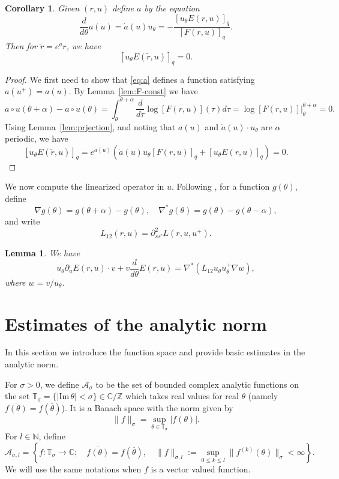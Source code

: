 \documentclass[12pt,reqno]{amsart}
\newtheorem{lem}[thm]{Lemma}
\newtheorem{cor}[thm]{Corollary}
\theoremstyle{remark}
\begin{document}
\begin{cor}\label{cor:proj}
Given $(r, u)$ define $a$ by the equation 
\begin{equation}
	\label{eq:a}
	\frac{d}{d\theta} a(u) = \dot{a}(u) u_\theta = - \frac{[u_\theta E(r, u)]_q}{[F(r, u)]_q}. 
\end{equation}
Then for ${\tilde{r}} = e^a r$, we have 
\[
	[u_\theta E({\tilde{r}}, u)]_q = 0. 
\]
\end{cor}
\begin{proof}
	We first need to show that \eqref{eq:a} defines a function satisfying $a(u^+) = a(u)$. By Lemma~\ref{lem:F-const} we have 
	\[
		a\circ u(\theta + \alpha) - a \circ u(\theta) = \int_{\theta}^{\theta + \alpha} \frac{d}{d \tau} \log [F(r, u)](\tau) d\tau = \log[F(r, u)]\bigr|_\theta^{\theta + \alpha} = 0. 
	\]
	Using Lemma~\ref{lem:prjection}, and noting that $a(u)$ and $\dot{a}(u) \cdot u_\theta$ are $\alpha$ periodic, we have 
	\[
		[u_\theta E({\tilde{r}}, u)]_q = e^{a(u)} \left( \dot{a}(u) u_\theta [F(r, u)]_q + [u_\theta E(r, u)]_q \right) = 0. 
	\]
\end{proof}

We now compute the linearized operator in $u$. Following \cite{LM2001}, for a function $g(\theta)$, define 
\[
	\nabla g(\theta) = g(\theta + \alpha) - g(\theta), \quad 
	\nabla^* g(\theta) = g(\theta) - g(\theta - \alpha), 
\]
and write 
\[
	L_{12}(r, u) = \partial^2_{ss'}L(r, u, u^+). 
\]

\begin{lem}\cite{LM2001}
We have 
\begin{equation}
	\label{eq:moser-levi}
	u_\theta \partial_u E(r, u)\cdot v + v \frac{d}{d\theta} E(r, u) = 
	\nabla^*\left( L_{12} u_\theta u_\theta^+ \nabla w \right),
\end{equation}
where $w = v/u_\theta$. 
\end{lem}

\section{Estimates of the analytic norm}
\label{sec:analytic-est}

In this section we introduce the function space and provide basic estimates in the analytic norm. 

For $\sigma >0$, we define ${\mathcal{A}}_\sigma$ to be the set of bounded complex analytic functions on  the set ${\mathbb{T}}_\sigma = \{|{\mathrm{Im}\,} \theta| < \sigma\} \in {\mathbb{C}}/{\mathbb{Z}}$ which takes real values for real $\theta$ (namely $\overline{f(\theta)} = f(\overline{\theta})$). It is a Banach space with the norm given by 
\[
	\|f\|_\sigma = \sup_{\theta \in {\mathbb{T}}_\sigma} |f(\theta)|.
\]
For $l \in {\mathbb{N}}$, define 
\[
	{\mathcal{A}}_{\sigma, l} = \left\{ f: {\mathbb{T}}_\sigma \to {\mathbb{C}}; \quad \overline{f(\theta)} = f(\overline{\theta}), \quad  \|f\|_{\sigma, l} := \sup_{0 \le k \le l} \|f^{(k)}(\theta)\|_\sigma < \infty \right\}. 
\]
We will use the same notations when $f$ is a vector valued function.
\end{document}
